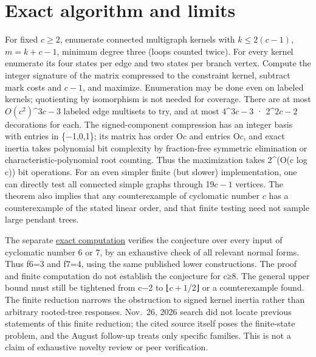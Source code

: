 \documentclass[11pt]{article}
\begin{document}
\section{Exact algorithm and limits}\label{exact-algorithm-and-limits}

For fixed \(c\ge 2\), enumerate connected multigraph kernels with \(k\le 2(c-1)\), \(m=k+c-1\), minimum degree three (loops counted twice). For every kernel enumerate its four states per edge and two states per branch vertex. Compute the integer signature of the matrix compressed to the constraint kernel, subtract mark costs and \(c-1\), and maximize. Enumeration may be done even on labeled kernels; quotienting by isomorphism is not needed for coverage. There are at most \(O(c^2)\)\^{}\(3c-3\) labeled edge multisets to try, and at most 4\^{}\(3c-3\) · 2\^{}\(2c-2\) decorations for each. The signed-component compression has an integer basis with entries in \{−1,0,1\}; its matrix has order O\(c\) and entries O\(c\), and exact inertia takes polynomial bit complexity by fraction-free symmetric elimination or characteristic-polynomial root counting. Thus the maximization takes 2\^{}(O(c log c)) bit operations. For an even simpler finite (but slower) implementation, one can directly test all connected simple graphs through 19\(c-1\) vertices. The theorem also implies that any counterexample of cyclomatic number \(c\) has a counterexample of the stated linear order, and that finite testing need not sample large pendant trees.

The separate \href{COMPUTATION.md}{exact computation} verifies the conjecture over every input of cyclomatic number 6 or 7, by an exhaustive check of all relevant normal forms. Thus f\(6\)=3 and f\(7\)=4, using the same published lower constructions. The proof and finite computation do not establish the conjecture for c≥8. The general upper bound must still be tightened from c−2 to ⌊\(c+1\)/2⌋ or a counterexample found. The finite reduction narrows the obstruction to signed kernel inertia rather than arbitrary rooted-tree responses. Nov.~26, 2026 search did not locate previous statements of this finite reduction; the cited source itself poses the finite-state problem, and the August follow-up treats only specific families. This is not a claim of exhaustive novelty review or peer verification.
\end{document}
